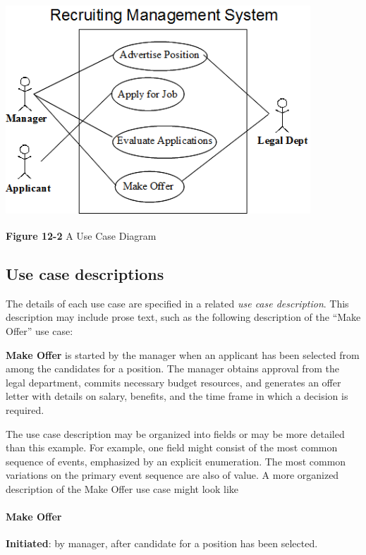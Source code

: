 \begin{center}
\includegraphics[width=4.5in,height=3.15in]{ub-img/usecase2.png}

{\sffamily\bfseries Figure 12-2}
{\sffamily A Use Case Diagram}
\end{center}

\subsection{Use case descriptions}

The details of each use case are specified in a related \textit{use case
description}. This description may include prose text, such as the
following description of the ``Make Offer'' use case:

\textbf{Make Offer} is started by the manager when an applicant has been
selected from among the candidates for a position. The manager obtains
approval from the legal department, commits necessary budget resources,
and generates an offer letter with details on salary, benefits, and the
time frame in which a decision is required.

The use case description may be organized into fields or may be more
detailed than this example. For example, one field might consist of the
most common sequence of events, emphasized by an explicit enumeration.
The most common variations on the primary event sequence are also of
value. A more organized description of the Make Offer use case might
look like

\paragraph[Make Offer]{\bfseries Make Offer}
\textbf{Initiated}: by manager, after candidate for a position has been
selected.

